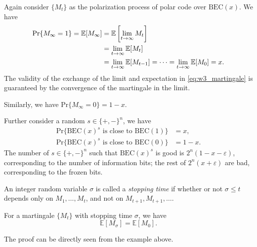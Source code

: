 \begin{example}
    Again consider $\{M_t\}$ as the polarization process of polar code over $\mathrm{BEC}(x)$. We have
    \begin{align}
        \mathrm{Pr}\{M_\infty=1\} = \mathbb{E}[M_\infty] &= \mathbb{E}\left[\lim_{t\rightarrow\infty} M_t\right] \notag\\
        &= \lim_{t\rightarrow\infty} \mathbb{E}[M_t] \label{eq:w3_martingale}\\
        &= \lim_{t\rightarrow\infty} \mathbb{E}[M_{t-1}] = \cdots = \lim_{t\rightarrow\infty} \mathbb{E}[M_0] = x. \notag
    \end{align}
    The validity of the exchange of the limit and expectation in \autoref{eq:w3_martingale} is guaranteed by the convergence of the martingale in the limit.

    Similarly, we have $\mathrm{Pr}\{M_\infty=0\} = 1-x$.
    
    Further consider a random $s\in\{+,-\}^n$, we have
    \begin{equation}\begin{aligned} \label{eq:w3_martingale_conv}
        \mathrm{Pr}\{\mathrm{BEC}(x)^s \text{ is close to }\mathrm{BEC}(1)\} &= x, \\
        \mathrm{Pr}\{\mathrm{BEC}(x)^s \text{ is close to }\mathrm{BEC}(0)\} &= 1-x.
    \end{aligned}\end{equation}
    The number of $s\in\{+,-\}^n$ such that $\mathrm{BEC}(x)^s$ is good is $2^n(1-x-\varepsilon)$, corresponding to the number of information bits; the rest of $2^n(x+\varepsilon)$ are bad, corresponding to the frozen bits.
\end{example}


\begin{definition}
    An integer random variable $\sigma$ is called a \textit{stopping time} if whether or not $\sigma\le t$ depends only on $M_1,\ldots,M_t$, and not on $M_{t+1},M_{t+1},\ldots$.
\end{definition}
\begin{theorem}
    For a martingale $\{M_t\}$ with stopping time $\sigma$, we have
    \begin{equation}
        \mathbb{E}[M_\sigma] = \mathbb{E}[M_0].
    \end{equation}
\end{theorem}
The proof can be directly seen from the example above.

